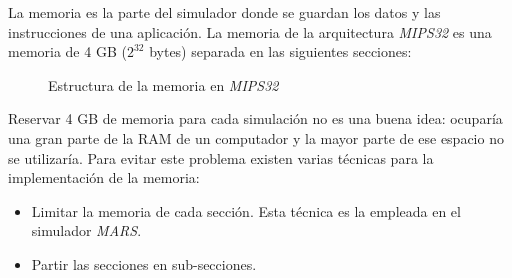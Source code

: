 La memoria es la parte del simulador donde se guardan los datos
y las instrucciones de una aplicación.
La memoria de la arquitectura \textit{MIPS32} es una memoria de 4 GB
($2^{32}$ bytes) separada en las siguientes secciones:

\begin{figure}[H]
    \centering
    \caption{Estructura de la memoria en \textit{MIPS32}}
    \label{fig:memory-table}
\end{figure}

Reservar 4 GB de memoria para cada simulación no es una buena idea:
ocuparía una gran parte de la RAM de un computador y
la mayor parte de ese espacio no se utilizaría.
Para evitar este problema existen varias técnicas para la
implementación de la memoria:
\begin{itemize}
    \item Limitar la memoria de cada sección.
    Esta técnica es la empleada en el simulador \textit{MARS}.
    \item Partir las secciones en sub-secciones.
\end{itemize}

